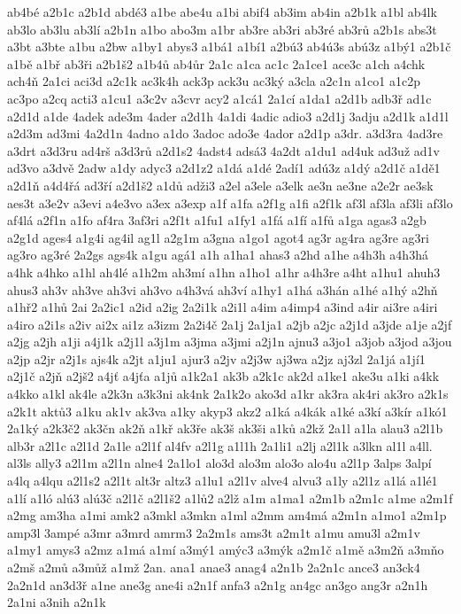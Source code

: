 {ab4bé
a2b1c
a2b1d
abdé3
a1be
abe4u
a1bi
abif4
ab3im
ab4in
a2b1k
a1bl
ab4lk
ab3lo
ab3lu
ab3lí
a2b1n
a1bo
abo3m
a1br
ab3re
ab3ri
ab3ré
ab3rů
a2b1s
abs3t
a3bt
a3bte
a1bu
a2bw
a1by1
abys3
a1bá1
a1bí1
a2bú3
ab4ú3s
abú3z
a1bý1
a2b1č
a1bě
a1bř
ab3ři
a2b1š2
a1b4ů
ab4ůr
2a1c
a1ca
ac1c
2a1ce1
ace3c
a1ch
a4chk
ach4ň
2a1ci
aci3d
a2c1k
ac3k4h
ack3p
ack3u
ac3ký
a3cla
a2c1n
a1co1
a1c2p
ac3po
a2cq
acti3
a1cu1
a3c2v
a3cvr
acy2
a1cá1
2a1cí
a1da1
a2d1b
adb3ř
ad1c
a2d1d
a1de
4adek
ade3m
4ader
a2d1h
4a1di
4adic
adio3
a2d1j
3adju
a2d1k
a1d1l
a2d3m
ad3mi
4a2d1n
4adno
a1do
3adoc
ado3e
4ador
a2d1p
a3dr.
a3d3ra
4ad3re
a3drt
a3d3ru
ad4rš
a3d3rů
a2d1s2
4adst4
adsá3
4a2dt
a1du1
ad4uk
ad3už
ad1v
ad3vo
a3dvě
2adw
a1dy
adyc3
a2d1z2
a1dá
a1dé
2adí1
adú3z
a1dý
a2d1č
a1dě1
a2d1ň
a4d4řá
ad3ří
a2d1š2
a1dů
adži3
a2el
a3ele
a3elk
ae3n
ae3ne
a2e2r
ae3sk
aes3t
a3e2v
a3evi
a4e3vo
a3ex
a3exp
a1f
a1fa
a2f1g
a1fi
a2f1k
af3l
af3la
af3li
af3lo
af4lá
a2f1n
a1fo
af4ra
3af3ri
a2f1t
a1fu1
a1fy1
a1fá
a1fí
a1fů
a1ga
agas3
a2gb
a2g1d
ages4
a1g4i
ag4il
ag1l
a2g1m
a3gna
a1go1
agot4
ag3r
ag4ra
ag3re
ag3ri
ag3ro
ag3ré
2a2gs
ags4k
a1gu
agá1
a1h
a1ha1
ahas3
a2hd
a1he
a4h3h
a4h3há
a4hk
a4hko
a1hl
ah4lé
a1h2m
ah3mí
a1hn
a1ho1
a1hr
a4h3re
a4ht
a1hu1
ahuh3
ahus3
ah3v
ah3ve
ah3vi
ah3vo
a4h3vá
ah3ví
a1hy1
a1há
a3hán
a1hé
a1hý
a2hň
a1hř2
a1hů
2ai
2a2ic1
a2id
a2ig
2a2i1k
a2i1l
a4im
a4imp4
a3ind
a4ir
ai3re
a4iri
a4iro
a2i1s
a2iv
ai2x
ai1z
a3izm
2a2i4č
2a1j
2a1ja1
a2jb
a2jc
a2j1d
a3jde
a1je
a2jf
a2jg
a2jh
a1ji
a4j1k
a2j1l
a3j1m
a3jma
a3jmi
a2j1n
ajnu3
a3jo1
a3job
a3jod
a3jou
a2jp
a2jr
a2j1s
ajs4k
a2jt
a1ju1
ajur3
a2jv
a2j3w
aj3wa
a2jz
aj3zl
2a1já
a1jí1
a2j1č
a2jň
a2jš2
a4jť
a4jťa
a1jů
a1k2a1
ak3b
a2k1c
ak2d
a1ke1
ake3u
a1ki
a4kk
a4kko
a1kl
ak4le
a2k3n
a3k3ni
ak4nk
2a1k2o
ako3d
a1kr
ak3ra
ak4ri
ak3ro
a2k1s
a2k1t
aktů3
a1ku
ak1v
ak3va
a1ky
akyp3
akz2
a1ká
a4kák
a1ké
a3kí
a3kír
a1kó1
2a1ký
a2k3č2
ak3čn
ak2ň
a1kř
ak3ře
ak3š
ak3ši
a1ků
a2kž
2a1l
a1la
alau3
a2l1b
alb3r
a2l1c
a2l1d
2a1le
a2l1f
al4fv
a2l1g
a1l1h
2a1li1
a2lj
a2l1k
a3lkn
al1l
a4ll.
al3ls
ally3
a2l1m
a2l1n
alne4
2a1lo1
alo3d
alo3m
alo3o
alo4u
a2l1p
3alps
3alpí
a4lq
a4lqu
a2l1s2
a2l1t
alt3r
altz3
a1lu1
a2l1v
alve4
alvu3
a1ly
a2l1z
a1lá
a1lé1
a1lí
a1ló
alú3
alú3č
a2l1č
a2l1š2
a1lů2
a2lž
a1m
a1ma1
a2m1b
a2m1c
a1me
a2m1f
a2mg
am3ha
a1mi
amk2
a3mkl
a3mkn
a1ml
a2mm
am4má
a2m1n
a1mo1
a2m1p
amp3l
3ampé
a3mr
a3mrd
amrm3
2a2m1s
ams3t
a2m1t
a1mu
amu3l
a2m1v
a1my1
amys3
a2mz
a1má
a1mí
a3mý1
amýc3
a3mýk
a2m1č
a1mě
a3m2ň
a3mňo
a2mš
a2mů
a3můž
a1mž
2an.
ana1
anae3
anag4
a2n1b
2a2n1c
ance3
an3ck4
2a2n1d
an3d3ř
a1ne
ane3g
ane4i
a2n1f
anfa3
a2n1g
an4gc
an3go
ang3r
a2n1h
2a1ni
a3nih
a2n1k
}
